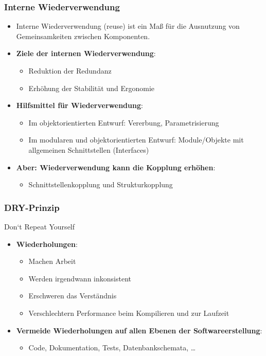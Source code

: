 \documentclass[11pt, a4paper]{article}
\begin{document}
\subsubsection{Interne Wiederverwendung}
\begin{itemize}
    \item Interne Wiederverwendung (reuse) ist ein Maß für die Ausnutzung von Gemeinsamkeiten zwischen Komponenten.
    \item \textbf{Ziele der internen Wiederverwendung}:
    \begin{itemize}
        \item Reduktion der Redundanz
        \item Erhöhung der Stabilität und Ergonomie
    \end{itemize}
    \item \textbf{Hilfsmittel für Wiederverwendung}:
    \begin{itemize}
        \item Im objektorientierten Entwurf: Vererbung, Parametrisierung
        \item Im modularen und objektorientierten Entwurf: Module/Objekte mit allgemeinen Schnittstellen (Interfaces)
    \end{itemize}
    \item \textbf{Aber: Wiederverwendung kann die Kopplung erhöhen}:
    \begin{itemize}
        \item Schnittstellenkopplung und Strukturkopplung
    \end{itemize}
\end{itemize}




\subsubsection{DRY-Prinzip}

Don‘t Repeat Yourself

\begin{itemize}
    \item \textbf{Wiederholungen}:
    \begin{itemize}
        \item Machen Arbeit
        \item Werden irgendwann inkonsistent
        \item Erschweren das Verständnis
        \item Verschlechtern Performance beim Kompilieren und zur Laufzeit
    \end{itemize}
    \item \textbf{Vermeide Wiederholungen auf allen Ebenen der Softwareerstellung}:
    \begin{itemize}
        \item Code, Dokumentation, Tests, Datenbankschemata, \dots
    \end{itemize}
\end{itemize}
\end{document}
